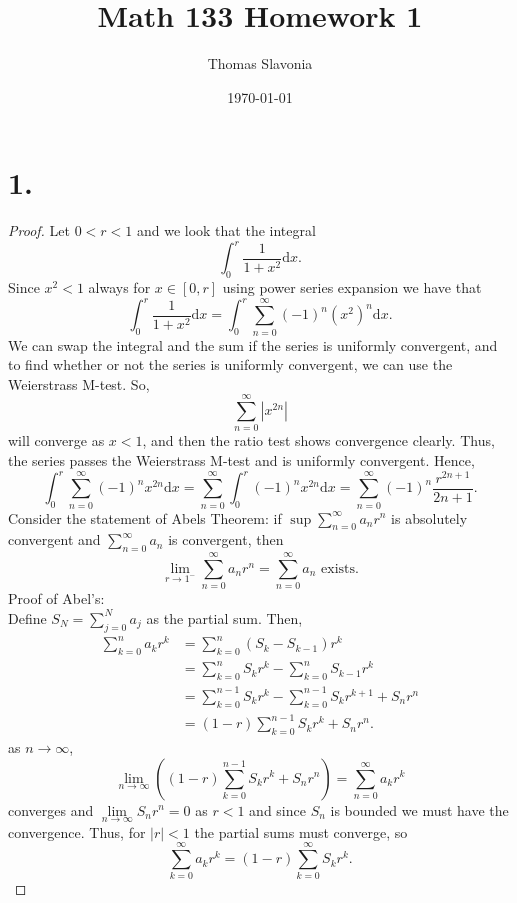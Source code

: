 \documentclass{article}
\title{Math 133 Homework 1}
\author{Thomas Slavonia}
\date{\today}
\begin{document}
\maketitle
\section*{1.}
\begin{proof}
Let $0 < r < 1$ and we look that the integral 
\[
 \int_0^r \frac{1}{1 + x^2} \mathrm{d}x. 
\]
Since $x^2 < 1$ always for $x \in [0, r]$ using power series expansion we have that 
\[
 \int_0^r \frac{1}{1 + x^2}\mathrm{d}x = \int_0^r \sum\limits_{n = 0}^{\infty} (-1)^n (x^2)^n \mathrm{d}x. 
\]
We can swap the integral and the sum if the series is uniformly convergent, and to find whether or not the series is uniformly convergent, we can use the Weierstrass M-test. So, 
\[
 \sum\limits_{n = 0}^{\infty} \left|x^{2n} \right| 
\]
will converge as $x < 1$, and then the ratio test shows convergence clearly. Thus, the series passes the Weierstrass M-test and is uniformly convergent. 
Hence, 
\[
 \int_0^r \sum\limits_{n = 0}^{\infty} (-1)^n x^{2n} \mathrm{d}x = \sum\limits_{n = 0}^{\infty} \int_0^r (-1)^n x^{2n} \mathrm{d}x = \sum\limits_{n = 0}^{\infty} (-1)^n \frac{r^{2n + 1}}{2n + 1}. 
\]
Consider the statement of Abels Theorem: if $\sup \sum\limits_{n = 0}^{\infty}a_nr^n$ is absolutely convergent and $\sum\limits_{n = 0}^{\infty}a_n$ is convergent, then 
\[
 \lim\limits_{r \to 1^-} \sum\limits_{n = 0}^{\infty}a_nr^n = \sum\limits_{n = 0}^{\infty} a_n \text{ exists}. 
\]
Proof of Abel's:\\
Define $S_N = \sum\limits_{j = 0}^{N}a_j$ as the partial sum. Then, 
\begin{align*}
  \sum\limits_{k = 0}^na_kr^k &= \sum\limits_{k = 0}^n (S_k - S_{k - 1})r^k \\
  &= \sum\limits_{k = 0}^nS_kr^k - \sum\limits_{k = 0}^nS_{k - 1}r^k \\
  &= \sum\limits_{k = 0}^{n - 1}S_kr^k - \sum\limits_{k = 0 }^{n - 1}S_kr^{k + 1} + S_nr^n\\
  &= (1 - r)\sum\limits_{k = 0}^{n - 1}S_kr^k + S_nr^n. 
\end{align*}
as $n \to \infty$, 
\[
 \lim\limits_{n \to \infty} \left((1 - r)\sum\limits_{k = 0}^{n - 1}S_kr^k + S_nr^n \right) = \sum\limits_{n = 0}^{\infty}a_kr^k
\]
converges and $\lim\limits_{n \to \infty}S_nr^n = 0$ as $r < 1$ and since $S_n$ is bounded we must have the convergence. Thus, for $|r| < 1$ the partial sums must converge, so 
\[
 \sum\limits_{k = 0}^{\infty}a_kr^k = (1 - r)\sum\limits_{k = 0}^{\infty}S_kr^k. 
\]
\end{proof}
\end{document}
